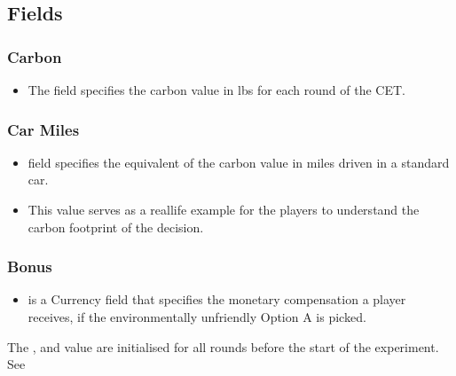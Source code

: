 \documentclass[letterpaper,10pt,english]{sphinxmanual}
\begin{document}
\subsection{Fields}
\label{\detokenize{Player_fields:fields}}

\subsubsection{Carbon}
\label{\detokenize{Player_fields:carbon}}\label{\detokenize{Player_fields:carbon-ref}}\begin{itemize}
\item {} 
The  field specifies the  carbon value in lbs for each round of the CET.

\end{itemize}


\subsubsection{Car Miles}
\label{\detokenize{Player_fields:car-miles}}\label{\detokenize{Player_fields:car-miles-ref}}\begin{itemize}
\item {} 
 field specifies the equivalent of the carbon value in miles driven in a standard car.

\item {} 
This value serves as a real\sphinxhyphen{}life example for the players to understand the carbon footprint of the decision.

\end{itemize}


\subsubsection{Bonus}
\label{\detokenize{Player_fields:bonus}}\label{\detokenize{Player_fields:bonus-ref}}\begin{itemize}
\item {} 
 is a Currency field that specifies the monetary compensation a player receives,
if the environmentally unfriendly Option A is picked.

\end{itemize}

The ,  and  value are initialised for all rounds before the start
of the experiment. See {\hyperref[\detokenize{Subsession_fields:creating-session-ref}]{}}
\end{document}
